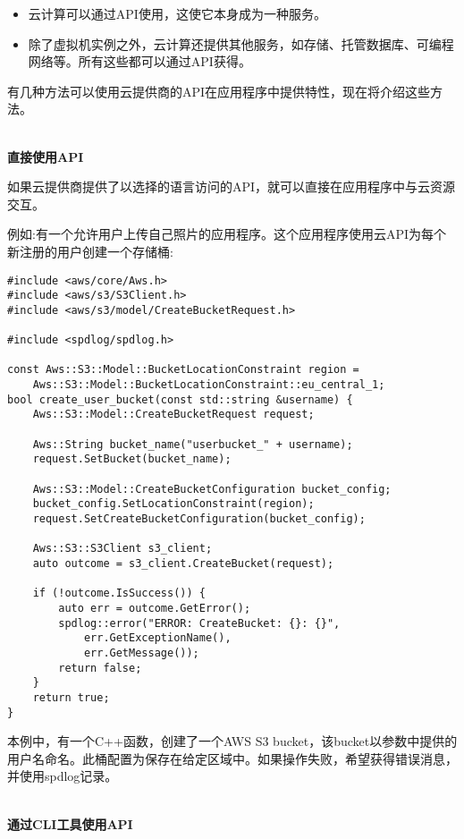 \begin{itemize}
\item 
云计算可以通过API使用，这使它本身成为一种服务。

\item 
除了虚拟机实例之外，云计算还提供其他服务，如存储、托管数据库、可编程网络等。所有这些都可以通过API获得。
\end{itemize}

有几种方法可以使用云提供商的API在应用程序中提供特性，现在将介绍这些方法。

\hspace*{\fill} \\ %
\noindent
\textbf{直接使用API}

如果云提供商提供了以选择的语言访问的API，就可以直接在应用程序中与云资源交互。

例如:有一个允许用户上传自己照片的应用程序。这个应用程序使用云API为每个新注册的用户创建一个存储桶:

\begin{lstlisting}[style=styleCXX]
#include <aws/core/Aws.h>
#include <aws/s3/S3Client.h>
#include <aws/s3/model/CreateBucketRequest.h>

#include <spdlog/spdlog.h>

const Aws::S3::Model::BucketLocationConstraint region =
	Aws::S3::Model::BucketLocationConstraint::eu_central_1;
bool create_user_bucket(const std::string &username) {
	Aws::S3::Model::CreateBucketRequest request;
	
	Aws::String bucket_name("userbucket_" + username);
	request.SetBucket(bucket_name);
	
	Aws::S3::Model::CreateBucketConfiguration bucket_config;
	bucket_config.SetLocationConstraint(region);
	request.SetCreateBucketConfiguration(bucket_config);
	
	Aws::S3::S3Client s3_client;
	auto outcome = s3_client.CreateBucket(request);
	
	if (!outcome.IsSuccess()) {
		auto err = outcome.GetError();
		spdlog::error("ERROR: CreateBucket: {}: {}",
			err.GetExceptionName(),
			err.GetMessage());
		return false;
	}
	return true;
}
\end{lstlisting}

本例中，有一个C++函数，创建了一个AWS S3 bucket，该bucket以参数中提供的用户名命名。此桶配置为保存在给定区域中。如果操作失败，希望获得错误消息，并使用spdlog记录。

\hspace*{\fill} \\ %
\noindent
\textbf{通过CLI工具使用API}

